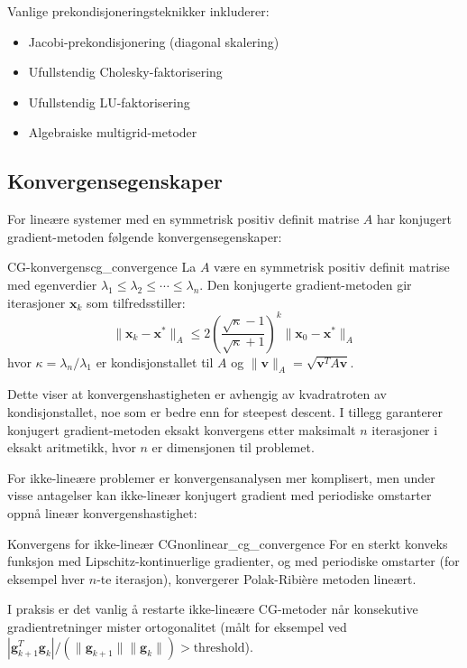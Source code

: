 Vanlige prekondisjoneringsteknikker inkluderer:
\begin{itemize}
	\item Jacobi-prekondisjonering (diagonal skalering)
	\item Ufullstendig Cholesky-faktorisering
	\item Ufullstendig LU-faktorisering
	\item Algebraiske multigrid-metoder
\end{itemize}

\subsection{Konvergensegenskaper}
\label{subsec:cg_convergence}

For lineære systemer med en symmetrisk positiv definit matrise \(A\) har konjugert gradient-metoden følgende konvergensegenskaper:

\begin{theorem}{CG-konvergens}{cg_convergence}
	La \(A\) være en symmetrisk positiv definit matrise med egenverdier \(\lambda_1 \leq \lambda_2 \leq \cdots \leq \lambda_n\). Den konjugerte gradient-metoden gir iterasjoner \(\symbf{x}_k\) som tilfredsstiller:
	\[
		\|\symbf{x}_k - \symbf{x}^*\|_A \leq 2 \left(\frac{\sqrt{\kappa} - 1}{\sqrt{\kappa} + 1}\right)^k \|\symbf{x}_0 - \symbf{x}^*\|_A
	\]
	hvor \(\kappa = \lambda_n/\lambda_1\) er kondisjonstallet til \(A\) og \(\|\symbf{v}\|_A = \sqrt{\symbf{v}^T A \symbf{v}}\).
\end{theorem}

Dette viser at konvergenshastigheten er avhengig av kvadratroten av kondisjonstallet, noe som er bedre enn for steepest descent. I tillegg garanterer konjugert gradient-metoden eksakt konvergens etter maksimalt \(n\) iterasjoner i eksakt aritmetikk, hvor \(n\) er dimensjonen til problemet.

For ikke-lineære problemer er konvergensanalysen mer komplisert, men under visse antagelser kan ikke-lineær konjugert gradient med periodiske omstarter oppnå lineær konvergenshastighet:

\begin{theorem}{Konvergens for ikke-lineær CG}{nonlinear_cg_convergence}
	For en sterkt konveks funksjon med Lipschitz-kontinuerlige gradienter, og med periodiske omstarter (for eksempel hver \(n\)-te iterasjon), konvergerer Polak-Ribière metoden lineært.
\end{theorem}

I praksis er det vanlig å restarte ikke-lineære CG-metoder når konsekutive gradientretninger mister ortogonalitet (målt for eksempel ved \(|\symbf{g}_{k+1}^T \symbf{g}_k| / (\|\symbf{g}_{k+1}\| \|\symbf{g}_k\|) > \text{threshold}\)).

